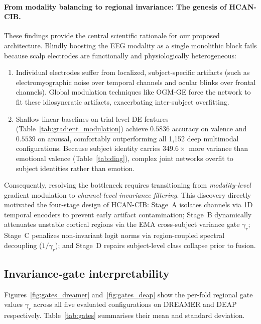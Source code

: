 \documentclass[a4paper,fleqn]{cas-sc}
\begin{document}
\paragraph{From modality balancing to regional invariance: The genesis of HCAN-CIB.}
These findings provide the central scientific rationale for our proposed architecture. Blindly boosting the EEG modality as a single monolithic block fails because scalp electrodes are functionally and physiologically heterogeneous:
\begin{enumerate}
    \item Individual electrodes suffer from localized, subject-specific artifacts (such as electromyographic noise over temporal channels and ocular blinks over frontal channels). Global modulation techniques like OGM-GE force the network to fit these idiosyncratic artifacts, exacerbating inter-subject overfitting.
    \item Shallow linear baselines on trial-level DE features (Table~\ref{tab:gradient_modulation}) achieve $0.5836$ accuracy on valence and $0.5539$ on arousal, comfortably outperforming all 1,152 deep multimodal configurations. Because subject identity carries $349.6\times$ more variance than emotional valence (Table~\ref{tab:diag}), complex joint networks overfit to subject identities rather than emotion.
\end{enumerate}
Consequently, resolving the bottleneck requires transitioning from \emph{modality-level} gradient modulation to \emph{channel-level invariance filtering}. This discovery directly motivated the four-stage design of HCAN-CIB: Stage~A isolates channels via 1D temporal encoders to prevent early artifact contamination; Stage~B dynamically attenuates unstable cortical regions via the EMA cross-subject variance gate $\gamma_r$; Stage~C penalizes non-invariant logit norms via region-coupled spectral decoupling ($1/\gamma_r$); and Stage~D repairs subject-level class collapse prior to fusion.

\subsection{Invariance-gate interpretability}

Figures~\ref{fig:gates_dreamer} and~\ref{fig:gates_deap} show the per-fold regional gate values $\gamma_r$ across all five evaluated configurations on DREAMER and DEAP respectively. Table~\ref{tab:gates} summarises their mean and standard deviation.
\end{document}
